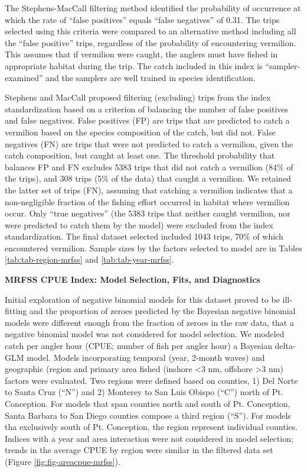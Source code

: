 \documentclass[11pt,
  english,
  a4paper,
]{article}
\begin{document}
The Stephens-MacCall filtering method identified the probability of occurrence at which the rate of ``false positives'' equals ``false negatives'' of 0.31. The trips selected using this criteria were compared to an alternative method including all the ``false positive'' trips, regardless of the probability of encountering vermilion. This assumes that if vermilion were caught, the anglers must have fished in appropriate habitat during the trip. The catch included in this index is ``sampler-examined'' and the samplers are well trained in species identification.

Stephens and MacCall proposed filtering (excluding) trips from the index standardization based on a criterion of balancing the number of false positives and false negatives. False positives (FP) are trips that are predicted to catch a vermilion based on the species composition of the catch, but did not. False negatives (FN) are trips that were not predicted to catch a vermilion, given the catch composition, but caught at least one. The threshold probability that balances FP and FN excludes 5383 trips that did not catch a vermilion (84\% of the trips), and 308 trips (5\% of the data) that caught a vermilion. We retained the latter set of trips (FN), assuming that catching a vermilion indicates that a non-negligible fraction of the fishing effort occurred in habitat where vermilion occur. Only ``true negatives'' (the 5383 trips that neither caught vermilion, nor were predicted to catch them by the model) were excluded from the index standardization. The final dataset selected included 1043 trips, 70\% of which encountered vermilion. Sample sizes by the factors selected to model are in Tables \ref{tab:tab-region-mrfss} and \ref{tab:tab-year-mrfss}.

\textbf{MRFSS CPUE Index: Model Selection, Fits, and Diagnostics}

Initial exploration of negative binomial models for this dataset proved to be ill-fitting and the proportion of zeroes predicted by the Bayesian negative binomial models were different enough from the fraction of zeroes in the raw data, that a negative binomial model was not considered for model selection. We modeled catch per angler hour (CPUE; number of fish per angler hour) a Bayesian delta-GLM model. Models incorporating temporal (year, 2-month waves) and geographic (region and primary area fished (inshore \textless3 nm, offshore \textgreater3 nm) factors were evaluated. Two regions were defined based on counties, 1) Del Norte to Santa Cruz (``N'') and 2) Monterey to San Luis Obispo (``C'') north of Pt. Conception. For models that span counties north and south of Pt. Conception, Santa Barbara to San Diego counties compose a third region (``S''). For models tha exclusively south of Pt. Conception, the region represent individual counties. Indices with a year and area interaction were not considered in model selection; trends in the average CPUE by region were similar in the filtered data set (Figure \ref{fig:fig-areacpue-mrfss}).
\end{document}
